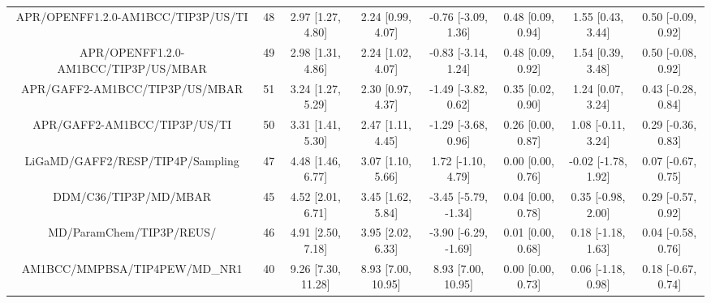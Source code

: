\documentclass[8pt]{article}
\begin{document}
\begin{center}
\begin{footnotesize}
\begin{longtable}{|cccccccc|}
   APR/OPENFF1.2.0-AM1BCC/TIP3P/US/TI &  48 &   2.97 [1.27, 4.80] &   2.24 [0.99, 4.07] &   -0.76 [-3.09, 1.36] &  0.48 [0.09, 0.94] &    1.55 [0.43, 3.44] &   0.50 [-0.09, 0.92] \\
 APR/OPENFF1.2.0-AM1BCC/TIP3P/US/MBAR &  49 &   2.98 [1.31, 4.86] &   2.24 [1.02, 4.07] &   -0.83 [-3.14, 1.24] &  0.48 [0.09, 0.92] &    1.54 [0.39, 3.48] &   0.50 [-0.08, 0.92] \\
       APR/GAFF2-AM1BCC/TIP3P/US/MBAR &  51 &   3.24 [1.27, 5.29] &   2.30 [0.97, 4.37] &   -1.49 [-3.82, 0.62] &  0.35 [0.02, 0.90] &    1.24 [0.07, 3.24] &   0.43 [-0.28, 0.84] \\
         APR/GAFF2-AM1BCC/TIP3P/US/TI &  50 &   3.31 [1.41, 5.30] &   2.47 [1.11, 4.45] &   -1.29 [-3.68, 0.96] &  0.26 [0.00, 0.87] &   1.08 [-0.11, 3.24] &   0.29 [-0.36, 0.83] \\
     LiGaMD/GAFF2/RESP/TIP4P/Sampling &  47 &   4.48 [1.46, 6.77] &   3.07 [1.10, 5.66] &    1.72 [-1.10, 4.79] &  0.00 [0.00, 0.76] &  -0.02 [-1.78, 1.92] &   0.07 [-0.67, 0.75] \\
                DDM/C36/TIP3P/MD/MBAR &  45 &   4.52 [2.01, 6.71] &   3.45 [1.62, 5.84] &  -3.45 [-5.79, -1.34] &  0.04 [0.00, 0.78] &   0.35 [-0.98, 2.00] &   0.29 [-0.57, 0.92] \\
             MD/ParamChem/TIP3P/REUS/ &  46 &   4.91 [2.50, 7.18] &   3.95 [2.02, 6.33] &  -3.90 [-6.29, -1.69] &  0.01 [0.00, 0.68] &   0.18 [-1.18, 1.63] &   0.04 [-0.58, 0.76] \\
        AM1BCC/MMPBSA/TIP4PEW/MD\_NR1 &  40 &  9.26 [7.30, 11.28] &  8.93 [7.00, 10.95] &    8.93 [7.00, 10.95] &  0.00 [0.00, 0.73] &   0.06 [-1.18, 0.98] &   0.18 [-0.67, 0.74] \\
\end{longtable}
\end{footnotesize}
\end{center}
\end{document}
